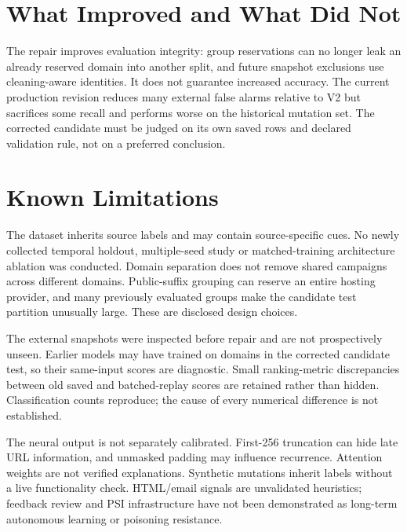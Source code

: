 \section{What Improved and What Did Not}
The repair improves evaluation integrity: group reservations can no longer leak an already reserved domain into another split, and future snapshot exclusions use cleaning-aware identities. It does not guarantee increased accuracy. The current production revision reduces many external false alarms relative to V2 but sacrifices some recall and performs worse on the historical mutation set. The corrected candidate must be judged on its own saved rows and declared validation rule, not on a preferred conclusion.

\section{Known Limitations}
The dataset inherits source labels and may contain source-specific cues. No newly collected temporal holdout, multiple-seed study or matched-training architecture ablation was conducted. Domain separation does not remove shared campaigns across different domains. Public-suffix grouping can reserve an entire hosting provider, and many previously evaluated groups make the candidate test partition unusually large. These are disclosed design choices.

The external snapshots were inspected before repair and are not prospectively unseen. Earlier models may have trained on domains in the corrected candidate test, so their same-input scores are diagnostic. Small ranking-metric discrepancies between old saved and batched-replay scores are retained rather than hidden. Classification counts reproduce; the cause of every numerical difference is not established.

The neural output is not separately calibrated. First-256 truncation can hide late URL information, and unmasked padding may influence recurrence. Attention weights are not verified explanations. Synthetic mutations inherit labels without a live functionality check. HTML/email signals are unvalidated heuristics; feedback review and PSI infrastructure have not been demonstrated as long-term autonomous learning or poisoning resistance.
